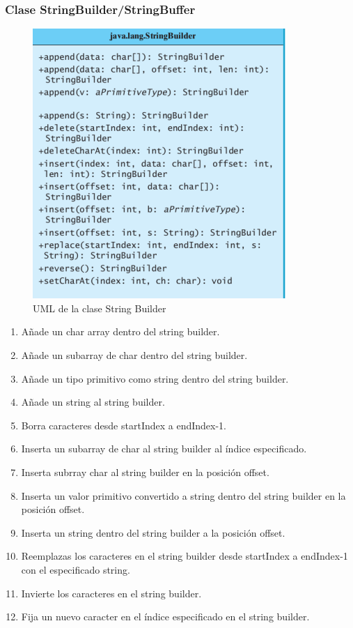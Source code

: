 \documentclass{beamer}
\begin{document}
\begin{frame}
\frametitle{Clase StringBuilder/StringBuffer} 
\begin{multicols}{2}
\begin{figure}
\includegraphics[scale=0.55]{imagenes/sb2.png} 
\caption{UML de la clase String Builder}
\end{figure} 
\begin{tiny}
\begin{enumerate}[<+-| alert@+>]
      \item Añade un char array dentro del string builder.
      \item Añade un subarray de char dentro del string builder.
      \item Añade un tipo primitivo como string dentro del string builder. 
     \item Añade un string al string builder.
      \item Borra caracteres desde startIndex a endIndex-1.
      \item Inserta un subarray de char al string builder al índice especificado.
      \item Inserta subrray char al string builder en la posición offset.
      \item Inserta un valor primitivo convertido a string dentro del string builder en la posición offset.
      \item Inserta un string dentro del string builder a la posición offset.
      \item Reemplazas los caracteres en el string builder desde startIndex
a endIndex-1 con el  especificado string.
	\item Invierte los caracteres en el string builder.
	\item Fija un nuevo caracter en el índice especificado en el string builder.
      \end{enumerate}
\end{tiny}
\end{multicols}
\pause
\end{frame}
\end{document}

